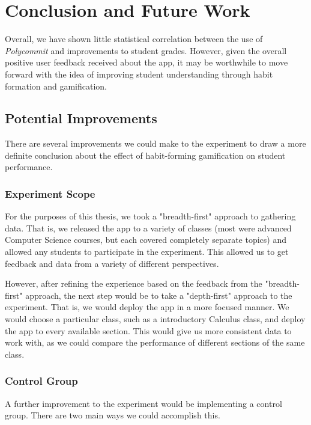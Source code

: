 \chapter{Conclusion and Future Work}

\par Overall, we have shown little statistical correlation between the use of \textit{Polycommit} and improvements to student grades. However, given the overall positive user feedback received about the app, it may be worthwhile to move forward with the idea of improving student understanding through habit formation and gamification.

\section{Potential Improvements}


\par There are several improvements we could make to the experiment to draw a more definite conclusion about the effect of habit-forming gamification on student performance.

\subsection{Experiment Scope}

\par For the purposes of this thesis, we took a "breadth-first" approach to gathering data. That is, we released the app to a variety of classes (most were advanced Computer Science courses, but each covered completely separate topics) and allowed any students to participate in the experiment. This allowed us to get feedback and data from a variety of different perspectives.

\par However, after refining the experience based on the feedback from the "breadth-first" approach, the next step would be to take a "depth-first" approach to the experiment. That is, we would deploy the app in a more focused manner. We would choose a particular class, such as a introductory Calculus class, and deploy the app to every available section. This would give us more consistent data to work with, as we could compare the performance of different sections of the same class.

\subsection{Control Group}
\par A further improvement to the experiment would be implementing a control group. There are two main ways we could accomplish this. 


